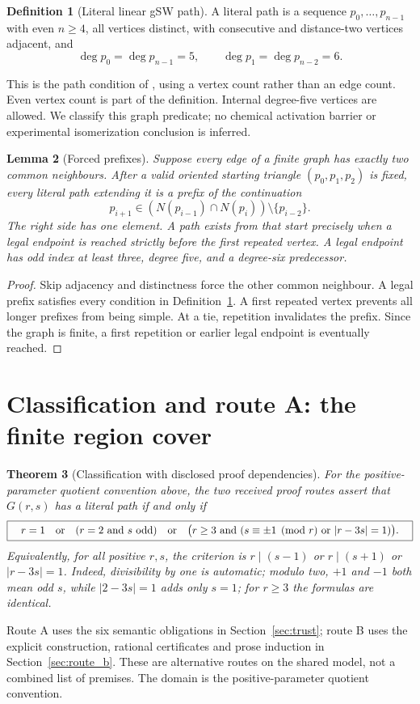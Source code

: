 \documentclass[11pt]{amsart}
\newcommand{\claimid}[1]{}
\newtheorem{theorem}{Theorem}
\newtheorem{lemma}[theorem]{Lemma}
\theoremstyle{definition}\newtheorem{definition}[theorem]{Definition}
\begin{document}
\begin{definition}[Literal linear gSW path]\label{def:literal}
A literal path is a sequence $p_0,\ldots,p_{n-1}$ with even $n\ge4$,
all vertices distinct, with consecutive and distance-two vertices
adjacent, and
\[
 \deg p_0=\deg p_{n-1}=5,\qquad
 \deg p_1=\deg p_{n-2}=6.
\]
\end{definition}
\claimid{def:literal}
This is the path condition of \cite[Definition 1(a)]{BBS}, using a
vertex count rather than an edge count. Even vertex count is part of
the definition. Internal degree-five vertices are allowed. We classify
this graph predicate; no chemical activation barrier or experimental
isomerization conclusion is inferred.

\begin{lemma}[Forced prefixes]\label{lem:forced}
Suppose every edge of a finite graph has exactly two common neighbours.
After a valid oriented starting triangle $(p_0,p_1,p_2)$ is fixed,
every literal path extending it is a prefix of the continuation
\[
 p_{i+1}\in(N(p_{i-1})\cap N(p_i))\setminus\{p_{i-2}\}.
\]
The right side has one element. A path exists from that start precisely
when a legal endpoint is reached strictly before the first repeated
vertex. A legal endpoint has odd index at least three, degree five,
and a degree-six predecessor.
\end{lemma}
\claimid{lem:forced}
\begin{proof}
Skip adjacency and distinctness force the other common neighbour.
A legal prefix satisfies every condition in Definition~\ref{def:literal}.
A first repeated vertex prevents all longer prefixes from being simple.
At a tie, repetition invalidates the prefix. Since the graph is finite,
a first repetition or earlier legal endpoint is eventually reached.
\end{proof}

\section{Classification and route A: the finite region cover}
\begin{theorem}[Classification with disclosed proof dependencies]\label{thm:d12-classification}
For the positive-parameter quotient convention above, the two received
proof routes assert that $G(r,s)$ has a literal path if and only if
\[
 \boxed{\quad
 r=1\quad\hbox{or}\quad
 (r=2\ \hbox{and }s\hbox{ odd})\quad\hbox{or}\quad
 \bigl(r\ge3\ \hbox{and }(s\equiv\pm1\pmod r\ \hbox{or }|r-3s|=1)\bigr).
 \quad}
\]
Equivalently, for all positive $r,s$, the criterion is
$r\mid(s-1)$ or $r\mid(s+1)$ or $|r-3s|=1$. Indeed, divisibility by
one is automatic; modulo two, $+1$ and $-1$ both mean odd $s$, while
$|2-3s|=1$ adds only $s=1$; for $r\ge3$ the formulas are identical.
\end{theorem}
\claimid{thm:d12-classification}
Route A uses the six semantic obligations in Section~\ref{sec:trust};
route B uses the explicit construction, rational certificates and prose
induction in Section~\ref{sec:route_b}. These are alternative routes on
the shared model, not a combined list of premises. The domain is the
positive-parameter quotient convention.
\end{document}
